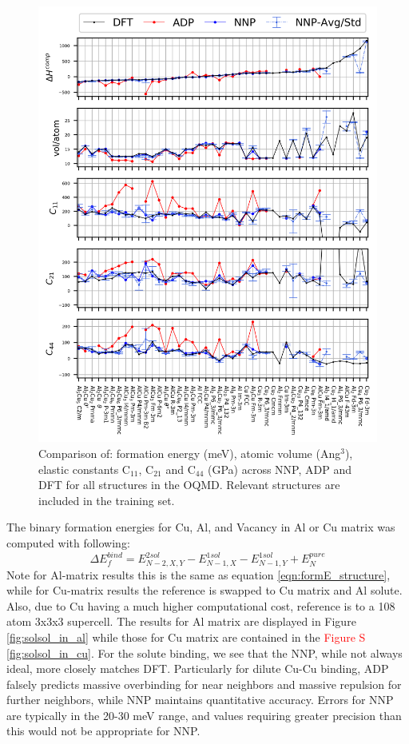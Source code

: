 \documentclass{article}
\begin{document}
\begin{figure}[H]%
\centering%
\includegraphics[width=1.2\textwidth,center]{figures/matparam_stats1.png}%
\caption{Comparison of: formation energy (meV), atomic volume (Ang$^3$), elastic constants C$_{11}$, C$_{21}$ and C$_{44}$ (GPa) across NNP, ADP and DFT for all structures in the OQMD. 
Relevant structures are included in the training set. }
\label{fig:matparam_stats1}
\end{figure}

The binary formation energies for Cu, Al, and Vacancy in Al or Cu matrix was computed with following:
\begin{equation}
\Delta E^{bind}_f = E^{2sol}_{N-2,X,Y}-E^{1sol}_{N-1,X}-E^{1sol}_{N-1,Y}+E^{pure}_N
\end{equation}
Note for Al-matrix results this is the same as equation \ref{eqn:formE_structure}, while for 
Cu-matrix results the reference is swapped to Cu matrix and Al solute.
Also, due to Cu having a much higher computational cost, reference is to a 108 atom 3x3x3 supercell.
The results for Al matrix are displayed in Figure \ref{fig:solsol_in_al} while those for Cu matrix are contained in the \textcolor{red}{Figure S \ref{fig:solsol_in_cu}}.
For the solute binding, we see that the NNP, while not always ideal, more closely matches DFT.
Particularly for dilute Cu-Cu binding, ADP falsely predicts massive overbinding for near neighbors and massive repulsion for further neighbors, while NNP maintains quantitative accuracy.
Errors for NNP are typically in the 20-30 meV range, and values requiring greater precision than this would not be appropriate for NNP.
\end{document}
